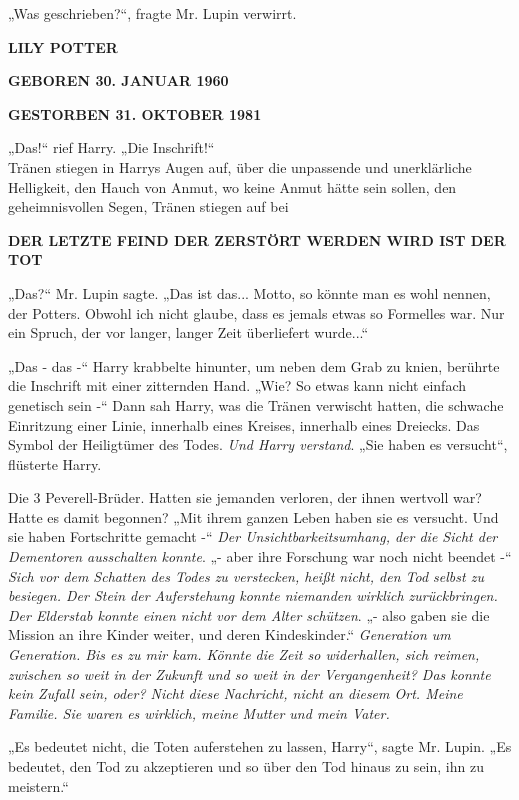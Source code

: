 {„Was geschrieben?“, fragte Mr. Lupin verwirrt.

\textbf{LILY POTTER}

\hfill\break

\textbf{GEBOREN 30. JANUAR 1960}

\hfill\break

\textbf{GESTORBEN 31. OKTOBER 1981}

„Das!“ rief Harry. „Die Inschrift!“\\ Tränen stiegen in Harrys Augen auf, über die unpassende und unerklärliche Helligkeit, den Hauch von Anmut, wo keine Anmut hätte sein sollen, den geheimnisvollen Segen, Tränen stiegen auf bei

\textbf{DER LETZTE FEIND DER ZERSTÖRT WERDEN WIRD IST DER TOT}

„Das?“ Mr. Lupin sagte. „Das ist das... Motto, so könnte man es wohl nennen, der Potters. Obwohl ich nicht glaube, dass es jemals etwas so Formelles war. Nur ein Spruch, der vor langer, langer Zeit überliefert wurde...“

„Das - das -“ Harry krabbelte hinunter, um neben dem Grab zu knien, berührte die Inschrift mit einer zitternden Hand. „Wie? So etwas kann nicht einfach genetisch sein -“ Dann sah Harry, was die Tränen verwischt hatten, die schwache Einritzung einer Linie, innerhalb eines Kreises, innerhalb eines Dreiecks. Das Symbol der Heiligtümer des Todes. \emph{Und Harry verstand}. „Sie haben es versucht“, flüsterte Harry.

Die 3 Peverell-Brüder. Hatten sie jemanden verloren, der ihnen wertvoll war? Hatte es damit begonnen? „Mit ihrem ganzen Leben haben sie es versucht. Und sie haben Fortschritte gemacht -“ \emph{Der Unsichtbarkeitsumhang, der die Sicht der Dementoren ausschalten konnte}. „- aber ihre Forschung war noch nicht beendet -“ \emph{Sich vor dem Schatten des Todes zu verstecken, heißt nicht, den Tod selbst zu besiegen. Der Stein der Auferstehung konnte niemanden wirklich zurückbringen. Der Elderstab konnte einen nicht vor dem Alter schützen}. „- also gaben sie die Mission an ihre Kinder weiter, und deren Kindeskinder.“ \emph{Generation um Generation. Bis es zu mir kam. Könnte die Zeit so widerhallen, sich reimen, zwischen so weit in der Zukunft und so weit in der Vergangenheit? Das konnte kein Zufall sein, oder? Nicht diese Nachricht, nicht an diesem Ort. Meine Familie. Sie waren es wirklich, meine Mutter und mein Vater.}

„Es bedeutet nicht, die Toten auferstehen zu lassen, Harry“, sagte Mr. Lupin. „Es bedeutet, den Tod zu akzeptieren und so über den Tod hinaus zu sein, ihn zu meistern.“

}

